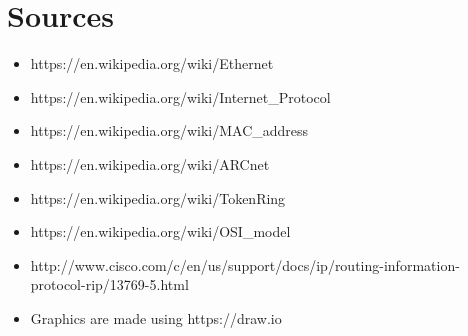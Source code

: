 \documentclass{article}
\begin{document}
	\newpage

\section{Sources}
	\begin{itemize}
		\itemsep0em
		\item https://en.wikipedia.org/wiki/Ethernet
		\item https://en.wikipedia.org/wiki/Internet\_Protocol
		\item https://en.wikipedia.org/wiki/MAC\_address
		\item https://en.wikipedia.org/wiki/ARCnet
		\item https://en.wikipedia.org/wiki/TokenRing
		\item https://en.wikipedia.org/wiki/OSI\_model
		\item http://www.cisco.com/c/en/us/support/docs/ip/routing-information-protocol-rip/13769-5.html
		\item Graphics are made using https://draw.io
	\end{itemize}
	
\end{document}
